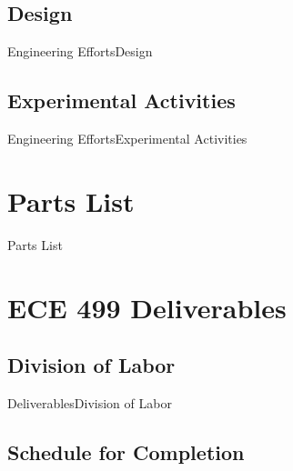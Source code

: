 \documentclass{beamer}
\begin{document}

\subsection{Design}

\begin{frame}{Engineering Efforts}{Design}
  
\end{frame}


\subsection{Experimental Activities}

\begin{frame}{Engineering Efforts}{Experimental Activities}
  
\end{frame}


\section{Parts List}

\begin{frame}{Parts List}{}
  
\end{frame}


\section{ECE 499 Deliverables}

\subsection{Division of Labor}

\begin{frame}{Deliverables}{Division of Labor}
  
\end{frame}


\subsection{Schedule for Completion}
\end{document}
